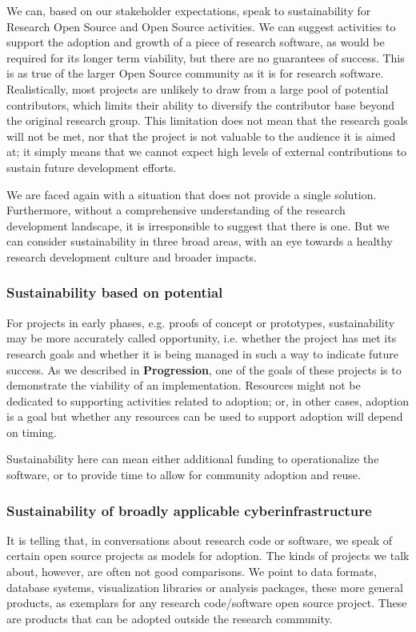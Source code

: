 \documentclass{article}
\begin{document}
We can, based on our stakeholder expectations, speak to sustainability for Research Open Source and Open Source activities. We can suggest activities to support the adoption and growth of a piece of research software, as would be required for its longer term viability, but there are no guarantees of success. This is as true of the larger Open Source community \autocite{eghbal_roads_2016} as it is for research software. Realistically, most projects are unlikely to draw from a large pool of potential contributors, which limits their ability to diversify the contributor base beyond the original research group. This limitation does not mean that the research goals will not be met, nor that the project is not valuable to the audience it is aimed at; it simply means that we cannot expect high levels of external contributions to sustain future development efforts. 
 
We are faced again with a situation that does not provide a single solution. Furthermore, without a comprehensive understanding of the research development landscape, it is irresponsible to suggest that there is one. But we can consider sustainability in three broad areas, with an eye towards a healthy research development culture and broader impacts.

\subsubsection{Sustainability based on potential}
For projects in early phases, e.g. proofs of concept or prototypes, sustainability may be more accurately called opportunity, i.e. whether the project has met its research goals and whether it is being managed in such a way to indicate future success. As we described in \textbf{Progression}, one of the goals of these projects is to demonstrate the viability of an implementation. Resources might not be dedicated to supporting activities related to adoption; or, in other cases, adoption is a goal but whether any resources can be used to support adoption will depend on timing. 
 
Sustainability here can mean either additional funding to operationalize the software, or to provide time to allow for community adoption and reuse. 

\subsubsection{Sustainability of broadly applicable cyberinfrastructure}
It is telling that, in conversations about research code or software, we speak of certain open source projects as models for adoption. The kinds of projects we talk about, however, are often not good comparisons. We point to data formats, database systems, visualization libraries or analysis packages, these more general products, as exemplars for any research code/software open source project. These are products that can be adopted outside the research community.
 
\end{document}
